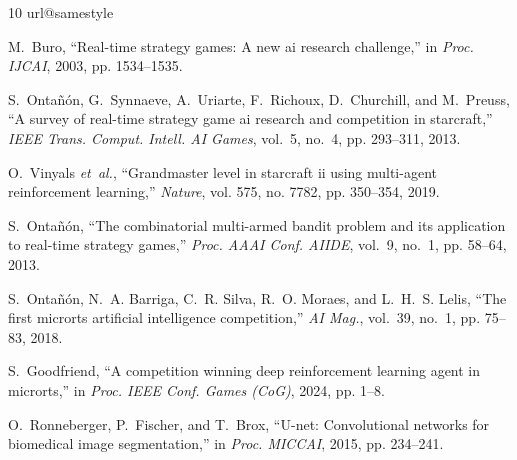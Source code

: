 \documentclass[conference]{IEEEtran}
\begin{document}
\begin{thebibliography}{10}
\providecommand{\url}[1]{#1}
\csname url@samestyle\endcsname
\providecommand{\newblock}{\relax}
\providecommand{\bibinfo}[2]{#2}
\providecommand{\BIBentrySTDinterwordspacing}{\spaceskip=0pt\relax}
\providecommand{\BIBentryALTinterwordstretchfactor}{4}
\providecommand{\BIBentryALTinterwordspacing}{\spaceskip=\fontdimen2\font plus
\BIBentryALTinterwordstretchfactor\fontdimen3\font minus
  \fontdimen4\font\relax}
\providecommand{\BIBforeignlanguage}[2]{{%
\expandafter\ifx\csname l@#1\endcsname\relax
\typeout{** WARNING: IEEEtran.bst: No hyphenation pattern has been}%
\typeout{** loaded for the language `#1'. Using the pattern for}%
\typeout{** the default language instead.}%
\else
\language=\csname l@#1\endcsname
\fi
#2}}
\providecommand{\BIBdecl}{\relax}
\BIBdecl

M.~Buro, ``Real-time strategy games: A new ai research challenge,'' in
  \emph{Proc. IJCAI}, 2003, pp. 1534--1535.

S.~Onta{\~n}{\'o}n, G.~Synnaeve, A.~Uriarte, F.~Richoux, D.~Churchill, and
  M.~Preuss, ``A survey of real-time strategy game ai research and competition
  in starcraft,'' \emph{IEEE Trans. Comput. Intell. AI Games}, vol.~5, no.~4,
  pp. 293--311, 2013.

O.~Vinyals \emph{et~al.}, ``Grandmaster level in starcraft ii using multi-agent
  reinforcement learning,'' \emph{Nature}, vol. 575, no. 7782, pp. 350--354,
  2019.

S.~Onta{\~n}{\'o}n, ``The combinatorial multi-armed bandit problem and its
  application to real-time strategy games,'' \emph{Proc. AAAI Conf. AIIDE},
  vol.~9, no.~1, pp. 58--64, 2013.

S.~Onta{\~n}{\'o}n, N.~A. Barriga, C.~R. Silva, R.~O. Moraes, and L.~H.~S.
  Lelis, ``The first microrts artificial intelligence competition,'' \emph{AI
  Mag.}, vol.~39, no.~1, pp. 75--83, 2018.

S.~Goodfriend, ``A competition winning deep reinforcement learning agent in
  microrts,'' in \emph{Proc. IEEE Conf. Games (CoG)}, 2024, pp. 1--8.

O.~Ronneberger, P.~Fischer, and T.~Brox, ``U-net: Convolutional networks for
  biomedical image segmentation,'' in \emph{Proc. MICCAI}, 2015, pp. 234--241.


\end{thebibliography}
\end{document}
